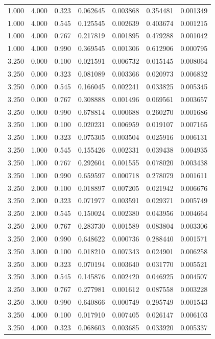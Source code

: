 \documentclass{article}
\begin{document}
\begin{longtable}{ccccccc}
    1.000& 4.000& 0.323&0.062645&0.003868&0.354481&0.001349\\
    1.000& 4.000& 0.545&0.125545&0.002639&0.403674&0.001215\\
    1.000& 4.000& 0.767&0.217819&0.001895&0.479288&0.001042\\
    1.000& 4.000& 0.990&0.369545&0.001306&0.612906&0.000795\\
    3.250& 0.000& 0.100&0.021591&0.006732&0.015145&0.008064\\
    3.250& 0.000& 0.323&0.081089&0.003366&0.020973&0.006832\\
    3.250& 0.000& 0.545&0.166045&0.002241&0.033825&0.005345\\
    3.250& 0.000& 0.767&0.308888&0.001496&0.069561&0.003657\\
    3.250& 0.000& 0.990&0.678814&0.000688&0.260270&0.001686\\
    3.250& 1.000& 0.100&0.020231&0.006959&0.019107&0.007165\\
    3.250& 1.000& 0.323&0.075305&0.003504&0.025916&0.006131\\
    3.250& 1.000& 0.545&0.155426&0.002331&0.039438&0.004935\\
    3.250& 1.000& 0.767&0.292604&0.001555&0.078020&0.003438\\
    3.250& 1.000& 0.990&0.659597&0.000718&0.278079&0.001611\\
    3.250& 2.000& 0.100&0.018897&0.007205&0.021942&0.006676\\
    3.250& 2.000& 0.323&0.071977&0.003591&0.029371&0.005749\\
    3.250& 2.000& 0.545&0.150024&0.002380&0.043956&0.004664\\
    3.250& 2.000& 0.767&0.283730&0.001589&0.083804&0.003306\\
    3.250& 2.000& 0.990&0.648622&0.000736&0.288440&0.001571\\
    3.250& 3.000& 0.100&0.018210&0.007343&0.024901&0.006258\\
    3.250& 3.000& 0.323&0.070194&0.003640&0.031770&0.005521\\
    3.250& 3.000& 0.545&0.145876&0.002420&0.046925&0.004507\\
    3.250& 3.000& 0.767&0.277981&0.001612&0.087558&0.003228\\
    3.250& 3.000& 0.990&0.640866&0.000749&0.295749&0.001543\\
    3.250& 4.000& 0.100&0.017910&0.007405&0.026147&0.006103\\
    3.250& 4.000& 0.323&0.068603&0.003685&0.033920&0.005337\\

\end{longtable}
\end{document}
